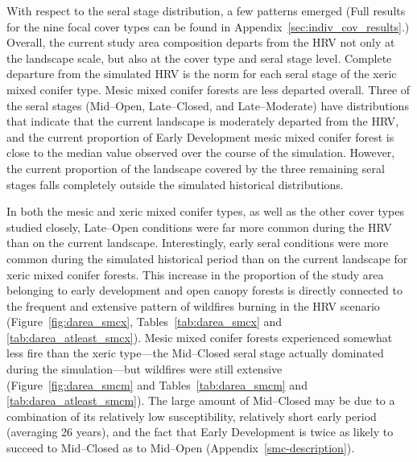 With respect to the seral stage distribution, a few patterns emerged (Full results for the nine focal cover types can be found in Appendix~\ref{sec:indiv_cov_results}.) Overall, the current study area composition departs from the HRV not only at the landscape scale, but also at the cover type and seral stage level. Complete departure from the simulated HRV is the norm for each seral stage of the xeric mixed conifer type. Mesic mixed conifer forests are less departed overall. Three of the seral stages (Mid--Open, Late--Closed, and Late--Moderate) have distributions that indicate that the current landscape is moderately departed from the HRV, and the current proportion of Early Development mesic mixed conifer forest is close to the median value observed over the course of the simulation. However, the current proportion of the landscape covered by the three remaining seral stages falls completely outside the simulated historical distributions.

In both the mesic and xeric mixed conifer types, as well as the other cover types studied closely, Late--Open conditions were far more common during the HRV than on the current landscape. Interestingly, early seral conditions were more common during the simulated historical period than on the current landscape for xeric mixed conifer forests. This increase in the proportion of the study area belonging to early development and open canopy forests is directly connected to the frequent and extensive pattern of wildfires burning in the HRV scenario (Figure~\ref{fig:darea_smcx}, Tables~\ref{tab:darea_smcx} and \ref{tab:darea_atleast_smcx}). Mesic mixed conifer forests experienced somewhat less fire than the xeric type---the Mid--Closed seral stage actually dominated during the simulation---but wildfires were still extensive (Figure~\ref{fig:darea_smcm} and Tables~\ref{tab:darea_smcm} and \ref{tab:darea_atleast_smcm}). The large amount of Mid--Closed may be due to a combination of its relatively low susceptibility, relatively short early period (averaging 26 years), and the fact that Early Development is twice as likely to succeed to Mid--Closed as to Mid--Open (Appendix~\ref{smc-description}).


